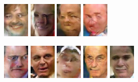 \begin{figure}[!h]
{        \includegraphics[scale=1]{figures/lfw/appendix3/lfw64x48color_image0060.png}
        \includegraphics[scale=1]{figures/lfw/appendix3/lfw64x48color_image0061.png}
        \includegraphics[scale=1]{figures/lfw/appendix3/lfw64x48color_image0062.png}
        \includegraphics[scale=1]{figures/lfw/appendix3/lfw64x48color_image0063.png}
    }
    \vspace{0.1cm}
    \centerline{
        \includegraphics[scale=1]{figures/lfw/appendix3/lfw64x48color_image0064.png}
        \includegraphics[scale=1]{figures/lfw/appendix3/lfw64x48color_image0065.png}
        \includegraphics[scale=1]{figures/lfw/appendix3/lfw64x48color_image0066.png}
        \includegraphics[scale=1]{figures/lfw/appendix3/lfw64x48color_image0067.png}
        \includegraphics[scale=1]{figures/lfw/appendix3/lfw64x48color_image0068.png}
}
\end{figure}
